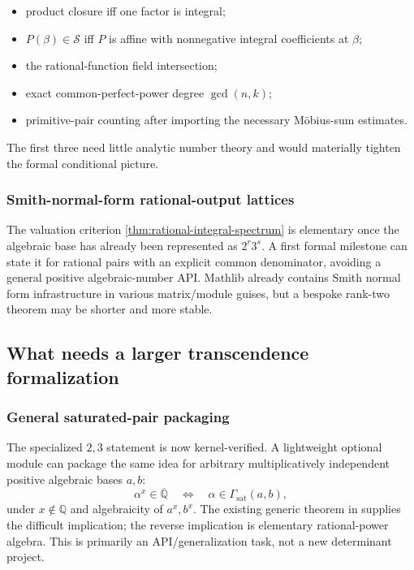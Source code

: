 \documentclass[11pt,oneside]{article}
\theoremstyle{definition}
\theoremstyle{remark}
\newcommand{\Q}{\mathbb Q}
\newcommand{\Qbar}{\overline{\mathbb Q}}
\newcommand{\Sol}{\mathcal S}
\newcommand{\GammaSat}{\Gamma_{\mathrm{sat}}}
\newcommand{\lean}[1]{\path{#1}}
\begin{document}
\begin{itemize}
\item product closure iff one factor is integral;
\item $P(\beta)\in\Sol$ iff $P$ is affine with nonnegative integral coefficients at $\beta$;
\item the rational-function field intersection;
\item exact common-perfect-power degree $\gcd(n,k)$;
\item primitive-pair counting after importing the necessary M\"obius-sum estimates.
\end{itemize}

The first three need little analytic number theory and would materially tighten the formal
conditional picture.

\subsubsection{Smith-normal-form rational-output lattices}

The valuation criterion \cref{thm:rational-integral-spectrum} is elementary once the
algebraic base has already been represented as $2^r3^s$.  A first formal milestone can state
it for rational pairs with an explicit common denominator, avoiding a general positive
algebraic-number API.  Mathlib already contains Smith normal form infrastructure in various
matrix/module guises, but a bespoke rank-two theorem may be shorter and more stable.

\subsection{What needs a larger transcendence formalization}

\subsubsection{General saturated-pair packaging}

The specialized $2,3$ statement is now kernel-verified.  A lightweight optional module can
package the same idea for arbitrary multiplicatively independent positive algebraic bases
$a,b$:
\[
 \alpha^x\in\Qbar\quad\Longleftrightarrow\quad
 \alpha\in\GammaSat(a,b),
\]
under $x\notin\Q$ and algebraicity of $a^x,b^x$.  The existing generic theorem in
\lean{AlgebraicSixExponentials} supplies the difficult implication; the reverse implication
is elementary rational-power algebra.  This is primarily an API/generalization task, not a
new determinant project.
\end{document}
